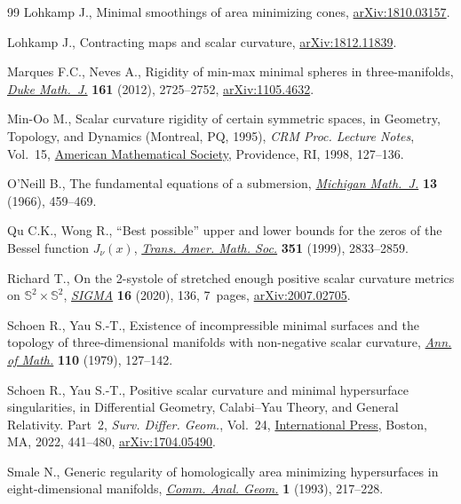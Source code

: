 \documentclass[10pt,a4paper]{amsart}
\numberwithin{equation}{section}
\begin{document}
\begin{thebibliography}{99}
Lohkamp J., Minimal smoothings of area minimizing cones, \href{https://arxiv.org/abs/1810.03157}{arXiv:1810.03157}.

Lohkamp J., Contracting maps and scalar curvature, \href{https://arxiv.org/abs/1812.11839}{arXiv:1812.11839}.

Marques F.C., Neves A., Rigidity of min-max minimal spheres in three-manifolds,
  \href{https://doi.org/10.1215/00127094-1813410}{\textit{Duke Math.~J.}} \textbf{161} (2012), 2725--2752, \href{https://arxiv.org/abs/1105.4632}{arXiv:1105.4632}.

Min-Oo M., Scalar curvature rigidity of certain symmetric spaces, in Geometry,
  {T}opology, and {D}ynamics ({M}ontreal, {PQ}, 1995), \textit{CRM Proc.
  Lecture Notes}, Vol.~15, \href{https://doi.org/10.1090/crmp/015/08}{American Mathematical Society}, Providence, RI, 1998,
  127--136.

O'Neill B., The fundamental equations of a submersion, \href{https://doi.org/10.1307/mmj/1028999604}{\textit{Michigan
  Math.~J.}} \textbf{13} (1966), 459--469.

Qu C.K., Wong R., ``{B}est possible'' upper and lower bounds for the zeros of
  the {B}essel function {$J_\nu(x)$}, \href{https://doi.org/10.1090/S0002-9947-99-02165-0}{\textit{Trans. Amer. Math. Soc.}}
  \textbf{351} (1999), 2833--2859.

Richard T., On the 2-systole of stretched enough positive scalar curvature
  metrics on {$\mathbb S^2\times\mathbb S^2$}, \href{https://doi.org/10.3842/SIGMA.2020.136}{\textit{SIGMA}} \textbf{16}
  (2020), 136, 7~pages, \href{https://arxiv.org/abs/2007.02705}{arXiv:2007.02705}.

Schoen R., Yau S.-T., Existence of incompressible minimal surfaces and the
  topology of three-dimensional manifolds with non-negative scalar curvature,
  \href{https://doi.org/10.2307/1971247}{\textit{Ann. of Math.}} \textbf{110} (1979), 127--142.

Schoen R., Yau S.-T., Positive scalar curvature and minimal hypersurface
  singularities, in {D}ifferential {G}eometry, {C}alabi--{Y}au {T}heory, and
  {G}eneral {R}elativity. {P}art~2, \textit{Surv. Differ. Geom.}, Vol.~24,
  \href{https://doi.org/10.4310/SDG.2019.v24.n1.a10}{International Press}, Boston, MA, 2022, 441--480, \href{https://arxiv.org/abs/1704.05490}{arXiv:1704.05490}.

Smale N., Generic regularity of homologically area minimizing hypersurfaces in
  eight-dimensional manifolds, \href{https://doi.org/10.4310/CAG.1993.v1.n2.a2}{\textit{Comm. Anal. Geom.}} \textbf{1} (1993),
  217--228.


\end{thebibliography}
\end{document}

